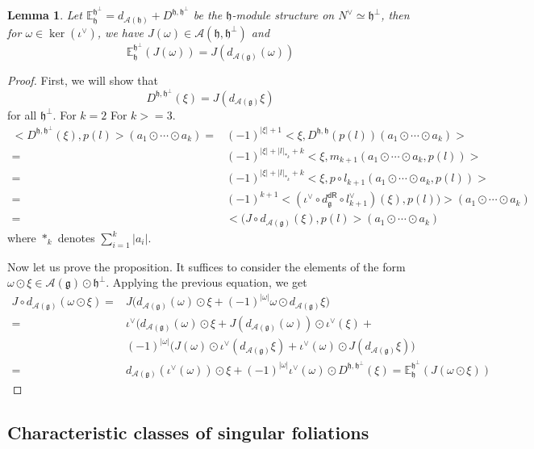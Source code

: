 \documentclass[12pt]{amsart}
\newtheorem{lem}[thm]{Lemma}
\theoremstyle{definition}
\theoremstyle{remark}
\numberwithin{equation}{section}
\newcommand{\CA}{{\mathcal A}}
\newcommand{\1}{{\mathbb{1}}}
\newcommand{\g}{\mathfrak{g}}
\newcommand{\h}{\mathfrak{h}}
\newcommand{\dr}{\mathsf{dR}}
\begin{document}
\begin{lem}
Let $\mathbb{E}_{\h}^{\h^{\perp}} = d_{\CA(\h)} + D^{\h, \h^{\perp}}$ be the $\h$-module structure on $N^{\vee} \simeq \h^{\perp}$, then for $\omega \in \ker (\iota^{\vee})$, we have $J(\omega) \in \CA(\h, \h^{\perp})$ and 
\begin{equation}
    \mathbb{E}_{\h}^{\h^{\perp}}(J(\omega)) = J(d_{\CA(\g)}(\omega))
\end{equation}

\end{lem}
\begin{proof}
First, we will show that $$D^{\h, \h^{\perp}}(\xi) = J(d_{\CA(\g)}\xi)$$ for all $\h^{\perp}$.
For $k = 2$
For $k >= 3$. 
\begin{align*}
    <D^{\h, \h^{\perp}}(\xi), p(l)>(a_1\odot \cdots \odot a_k) =& (-1)^{|\xi| + 1}<\xi, D^{\h, \h}(p(l))(a_1\odot \cdots \odot a_k)>\\
    =& (-1)^{|\xi| + |l|_{*_k} + k}<\xi, m_{k+1}(a_1\odot \cdots \odot a_k, p(l))>\\
    =&(-1)^{|\xi| + |l|_{*_k} + k}<\xi, p\circ l_{k+1}(a_1\odot \cdots \odot a_k, p(l))>\\
    =&(-1)^{k + 1}<(\iota^{\vee} \circ d^{\dr}_{\g} \circ l_{k+1}^{\vee})(\xi), p(l))>(a_1\odot \cdots \odot a_k)\\
    =& <(J\circ d_{\CA(\g)}(\xi), p(l)>(a_1\odot \cdots \odot a_k)
\end{align*}
where $*_k$ denotes $\sum_{i = 1}^k |a_i|$.

Now let us prove the proposition. It suffices to consider the elements of the form $\omega \odot \xi \in \CA(\g)\odot \h^{\perp}$. Applying the previous equation, we get
\begin{align*}
    J\circ d_{\CA(\g)}(\omega \odot \xi ) =& J\big( d_{\CA(\g)}(\omega) \odot \xi + (-1)^{|\omega|}\omega \odot d_{\CA(\g)}\xi\big) \\
    =& \iota^{\vee}(d_{\CA(\g)}(\omega) \odot \xi + J(d_{\CA(\g)}(\omega))\odot \iota^{\vee}(\xi) + \\
    & (-1)^{|\omega|}\big(J(\omega) \odot \iota^{\vee}(d_{\CA(\g)}\xi) + \iota^{\vee}(\omega) \odot J(d_{\CA(\g)}\xi) \big)\\
    =& d_{\CA(\g)}(\iota^{\vee}(\omega))\odot \xi + (-1)^{|\omega|} \iota^{\vee}(\omega)\odot D^{\h, \h^{\perp}}(\xi) = \mathbb{E}_{\h}^{\h^{\perp}}(J(\omega\odot \xi))
\end{align*}
\end{proof}

\subsection{Characteristic classes of singular foliations}
\end{document}
